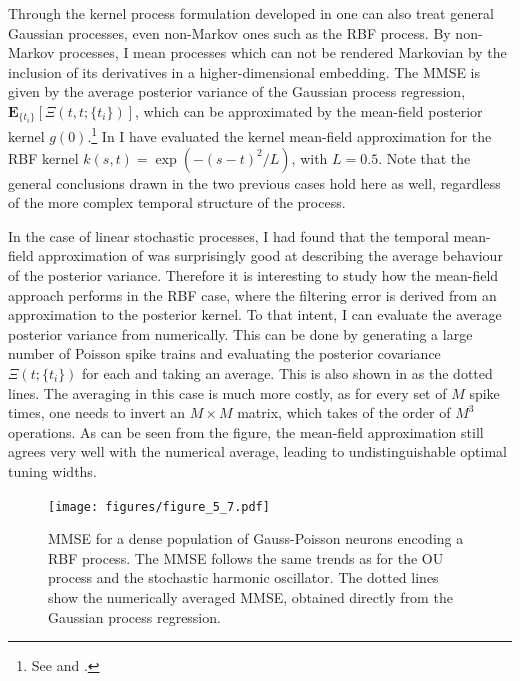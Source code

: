 Through the kernel process formulation developed in  one can also treat general Gaussian processes, even non-Markov ones such as the RBF process.
By non-Markov processes, I mean processes which can not be rendered Markovian by the inclusion of its derivatives in a higher-dimensional embedding.
The MMSE is given by the average posterior variance of the Gaussian process regression, $\boldsymbol{E}_{\{t_i\}}\left[\Xi(t,t;\{t_i\})\right]$, which can be approximated by the 
mean-field posterior kernel $g(0)$.\footnote{See  and .}
In  I have evaluated the kernel mean-field approximation for the RBF kernel $k(s,t) = \exp\left(-(s-t)^2/L\right)$, with $L= 0.5$. Note that the general
conclusions drawn in the two previous cases hold here as well, regardless of the more complex temporal structure of the process.\par

In the case of linear stochastic processes, I had found that the temporal mean-field approximation of  was surprisingly good at describing the average
behaviour of the posterior variance. Therefore it is interesting to study how the mean-field approach performs in the RBF case, where the filtering error is derived from
an approximation to the posterior kernel. To that intent, I can evaluate the average posterior variance from  numerically.
This can be done by generating a large number of Poisson spike trains and evaluating the posterior covariance $\Xi(t;\{t_i\})$ for each and taking an average.
This is also shown in  as the dotted lines.
The averaging in this case is much more costly, as for every set of $M$ spike times, one needs to invert an $M\times M$ matrix, which takes of the order of $M^3$ operations.
As can be seen from the figure, the mean-field approximation still agrees very well with the numerical average, leading to undistinguishable optimal tuning widths.

\begin{figure}
\label{fig:mmse_rbf}
\texttt{[image: figures/figure\_5\_7.pdf]}
\caption[Optimal encoders for the RBF process.]{MMSE for a dense population of Gauss-Poisson neurons encoding a RBF process. The MMSE follows the same trends as for the OU process and the stochastic
harmonic oscillator. The dotted lines show the numerically averaged MMSE, obtained directly from the Gaussian process regression.}
\end{figure}

